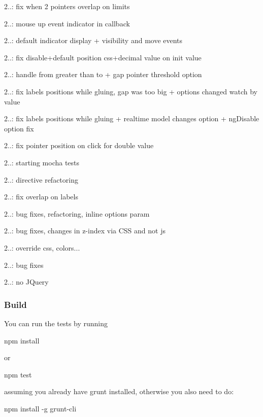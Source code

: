 \begin{DoxyItemize}
\item 2..\+: fix when 2 pointers overlap on limits
\item 2..\+: mouse up event indicator in callback
\item 2..\+: default indicator display + visibility and move events
\item 2..\+: fix disable+default position css+decimal value on init value
\item 2..\+: handle from greater than to + gap pointer threshold option
\item 2..\+: fix labels positions while gluing, gap was too big + options changed watch by value
\item 2..\+: fix labels positions while gluing + realtime model changes option + ng\+Disable option fix
\item 2..\+: fix pointer position on click for double value
\item 2..\+: starting mocha tests
\item 2..\+: directive refactoring
\item 2..\+: fix overlap on labels
\item 2..\+: bug fixes, refactoring, inline options param
\item 2..\+: bug fixes, changes in z-\/index via C\+SS and not js
\item 2..\+: override css, colors...
\item 2..\+: bug fixes
\item 2..\+: no J\+Query
\end{DoxyItemize}

\subsubsection*{Build}

You can run the tests by running


\begin{DoxyCode}
npm install
\end{DoxyCode}
 or 
\begin{DoxyCode}
npm test
\end{DoxyCode}


assuming you already have {\ttfamily grunt} installed, otherwise you also need to do\+:


\begin{DoxyCode}
npm install -g grunt-cli
\end{DoxyCode}


